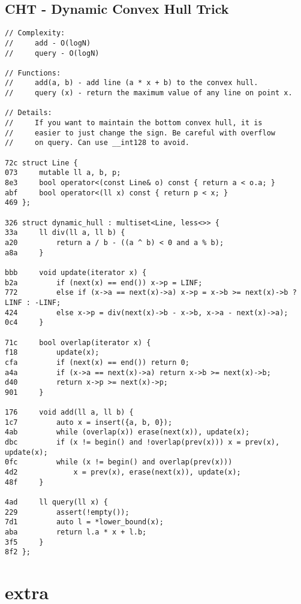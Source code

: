 \documentclass[11pt, a4paper, twoside]{article}
\begin{document}
\subsection{CHT - Dynamic Convex Hull Trick}
\begin{lstlisting}
// Complexity: 
//     add - O(logN)
//     query - O(logN)

// Functions:
//     add(a, b) - add line (a * x + b) to the convex hull.
//     query (x) - return the maximum value of any line on point x.

// Details:
//     If you want to maintain the bottom convex hull, it is
//     easier to just change the sign. Be careful with overflow
//     on query. Can use __int128 to avoid.

72c struct Line {
073     mutable ll a, b, p;
8e3     bool operator<(const Line& o) const { return a < o.a; }
abf     bool operator<(ll x) const { return p < x; }
469 };

326 struct dynamic_hull : multiset<Line, less<>> {
33a     ll div(ll a, ll b) { 
a20         return a / b - ((a ^ b) < 0 and a % b);
a8a     }
        
bbb     void update(iterator x) {
b2a         if (next(x) == end()) x->p = LINF;
772         else if (x->a == next(x)->a) x->p = x->b >= next(x)->b ? LINF : -LINF;
424         else x->p = div(next(x)->b - x->b, x->a - next(x)->a);
0c4     }
    
71c     bool overlap(iterator x) {
f18         update(x);
cfa         if (next(x) == end()) return 0;
a4a         if (x->a == next(x)->a) return x->b >= next(x)->b;
d40         return x->p >= next(x)->p;
901     }
            
176     void add(ll a, ll b) {
1c7         auto x = insert({a, b, 0});
4ab         while (overlap(x)) erase(next(x)), update(x);
dbc         if (x != begin() and !overlap(prev(x))) x = prev(x), update(x);
0fc         while (x != begin() and overlap(prev(x))) 
4d2             x = prev(x), erase(next(x)), update(x);
48f     }
        
4ad     ll query(ll x) {
229         assert(!empty());
7d1         auto l = *lower_bound(x);
aba         return l.a * x + l.b;
3f5     }
8f2 };
\end{lstlisting}



%
%

\section{extra}
\end{document}
